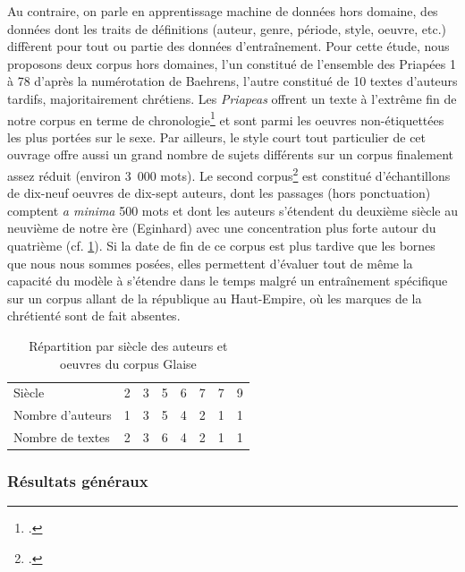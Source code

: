 Au contraire, on parle en apprentissage machine de données hors domaine, des données dont les traits de définitions (auteur, genre, période, style, oeuvre, etc.) diffèrent pour tout ou partie des données d'entraînement. Pour cette étude, nous proposons deux corpus hors domaines, l'un constitué de l'ensemble des Priapées 1 à 78 d'après la numérotation de Baehrens, l'autre constitué de 10 textes d'auteurs tardifs, majoritairement chrétiens. Les \textit{Priapeas} offrent un texte à l'extrême fin de notre corpus en terme de chronologie\footcite{citroni_les_2008} et sont parmi les oeuvres non-étiquettées les plus portées sur le sexe. Par ailleurs, le style court tout particulier de cet ouvrage offre aussi un grand nombre de sujets différents sur un corpus finalement assez réduit (environ 3~000 mots). Le second corpus\footcite{glaise_2020_corpus_tardif} est constitué d'échantillons de dix-neuf oeuvres de dix-sept auteurs, dont les passages (hors ponctuation) comptent \textit{a minima} 500 mots et dont les auteurs s'étendent du deuxième siècle au neuvième de notre ère (Eginhard) avec une concentration plus forte autour du quatrième (cf. \ref{corpus:glaise:dates}). Si la date de fin de ce corpus est plus tardive que les bornes que nous nous sommes posées, elles permettent d'évaluer tout de même la capacité du modèle à s'étendre dans le temps malgré un entraînement spécifique sur un corpus allant de la république au Haut-Empire, où les marques de la chrétienté sont de fait absentes.

\begin{table}[h]
\begin{tabular}{l|rrrrrrr}
Siècle           & 2 & 3 & 5 & 6 & 7 & 7 & 9 \\
Nombre d'auteurs & 1 & 3 & 5 & 4 & 2 & 1 & 1 \\
Nombre de textes & 2 & 3 & 6 & 4 & 2 & 1 & 1
\end{tabular}
\caption{Répartition par siècle des auteurs et oeuvres du corpus Glaise}
\label{corpus:glaise:dates}
\end{table}

\subsubsection{Résultats généraux}


